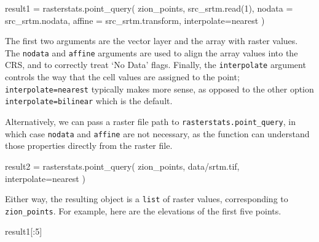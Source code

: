 \documentclass[
  letterpaper,
]{krantz}
\newenvironment{Shaded}{\begin{snugshade}}{\end{snugshade}}
\newcommand{\DecValTok}[1]{\textcolor[rgb]{0.68,0.00,0.00}{#1}}
\newcommand{\NormalTok}[1]{\textcolor[rgb]{0.00,0.23,0.31}{#1}}
\newcommand{\OperatorTok}[1]{\textcolor[rgb]{0.37,0.37,0.37}{#1}}
\newcommand{\StringTok}[1]{\textcolor[rgb]{0.13,0.47,0.30}{#1}}
\begin{document}
\begin{Shaded}
\begin{Highlighting}[]
\NormalTok{result1 }\OperatorTok{=}\NormalTok{ rasterstats.point\_query(}
\NormalTok{    zion\_points, }
\NormalTok{    src\_srtm.read(}\DecValTok{1}\NormalTok{), }
\NormalTok{    nodata }\OperatorTok{=}\NormalTok{ src\_srtm.nodata, }
\NormalTok{    affine }\OperatorTok{=}\NormalTok{ src\_srtm.transform,}
\NormalTok{    interpolate}\OperatorTok{=}\StringTok{\textquotesingle{}nearest\textquotesingle{}}
\NormalTok{)}
\end{Highlighting}
\end{Shaded}

The first two arguments are the vector layer and the array with raster
values. The \texttt{nodata} and \texttt{affine} arguments are used to
align the array values into the CRS, and to correctly treat `No Data'
flags. Finally, the \texttt{interpolate} argument controls the way that
the cell values are assigned to the point;
\texttt{interpolate=\textquotesingle{}nearest\textquotesingle{}}
typically makes more sense, as opposed to the other option
\texttt{interpolate=\textquotesingle{}bilinear\textquotesingle{}} which
is the default.

Alternatively, we can pass a raster file path to
\texttt{rasterstats.point\_query}, in which case \texttt{nodata} and
\texttt{affine} are not necessary, as the function can understand those
properties directly from the raster file.

\begin{Shaded}
\begin{Highlighting}[]
\NormalTok{result2 }\OperatorTok{=}\NormalTok{ rasterstats.point\_query(}
\NormalTok{    zion\_points, }
    \StringTok{\textquotesingle{}data/srtm.tif\textquotesingle{}}\NormalTok{,}
\NormalTok{    interpolate}\OperatorTok{=}\StringTok{\textquotesingle{}nearest\textquotesingle{}}
\NormalTok{)}
\end{Highlighting}
\end{Shaded}

Either way, the resulting object is a \texttt{list} of raster values,
corresponding to \texttt{zion\_points}. For example, here are the
elevations of the first five points.

\begin{Shaded}
\begin{Highlighting}[]
\NormalTok{result1[:}\DecValTok{5}\NormalTok{]}
\end{Highlighting}
\end{Shaded}
\end{document}
